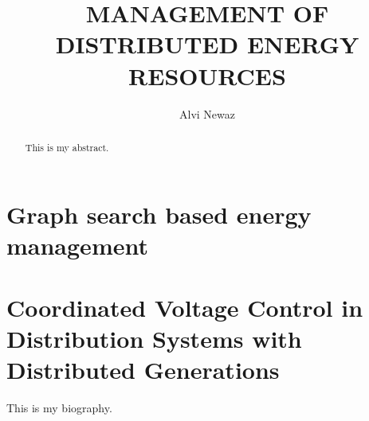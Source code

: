 \documentclass[11pt,expanded,copyright]{fsuthesis}
\title{MANAGEMENT OF DISTRIBUTED ENERGY RESOURCES}
\author{Alvi Newaz}
\begin{document}
\frontmatter
\maketitle
\makecommitteepage



\tableofcontents



\begin{abstract}
This is my abstract.
\end{abstract}

\mainmatter

\chapter{Graph search based energy management} \label{A8_cahp}


\chapter{Coordinated Voltage Control in Distribution
Systems with Distributed Generations} \label{CVC}






%
%
%

%






\begin{biosketch}
This is my biography.
\end{biosketch}
\end{document}
